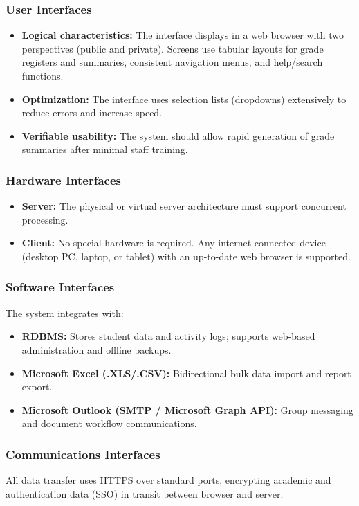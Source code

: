 \documentclass[11pt, a4paper]{article}
\begin{document}
\subsubsection{User Interfaces}
\begin{itemize}
    \item \textbf{Logical characteristics:} The interface displays in a web browser with two perspectives (public and private). Screens use tabular layouts for grade registers and summaries, consistent navigation menus, and help/search functions.
    \item \textbf{Optimization:} The interface uses selection lists (dropdowns) extensively to reduce errors and increase speed.
    \item \textbf{Verifiable usability:} The system should allow rapid generation of grade summaries after minimal staff training.
\end{itemize}

\subsubsection{Hardware Interfaces}
\begin{itemize}
    \item \textbf{Server:} The physical or virtual server architecture must support concurrent processing.
    \item \textbf{Client:} No special hardware is required. Any internet-connected device (desktop PC, laptop, or tablet) with an up-to-date web browser is supported.
\end{itemize}

\subsubsection{Software Interfaces}
The system integrates with:
\begin{itemize}
    \item \textbf{RDBMS:} Stores student data and activity logs; supports web-based administration and offline backups.
    \item \textbf{Microsoft Excel (.XLS/.CSV):} Bidirectional bulk data import and report export.
    \item \textbf{Microsoft Outlook (SMTP / Microsoft Graph API):} Group messaging and document workflow communications.
\end{itemize}

\subsubsection{Communications Interfaces}
All data transfer uses HTTPS over standard ports, encrypting academic and authentication data (SSO) in transit between browser and server.
\end{document}
